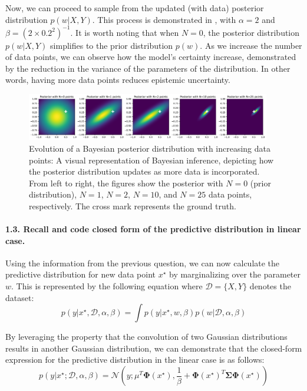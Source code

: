 Now, we can proceed to sample from the updated (with data) posterior distribution $p(w | X, Y)$. This process is demonstrated in , with $\alpha = 2$ and $\beta = (2 \times 0.2^2)^{-1}$. It is worth noting that when $N=0$, the posterior distribution $p(w|X,Y)$ simplifies to the prior distribution $p(w)$. As we increase the number of data points, we can observe how the model's certainty increase, demonstrated by the reduction in the variance of the parameters of the distribution. In other words, having more data points reduces epistemic uncertainty.

\begin{figure}[H]
    \centering
    \includegraphics[width=0.95\textwidth]{posterior.pdf}
    \caption{Evolution of a Bayesian posterior distribution with increasing data points: A visual representation of Bayesian inference, depicting how the posterior distribution updates as more data is incorporated. From left to right, the figures show the posterior with $N=0$ (prior distribution), $N=1$, $N=2$, $N=10$, and $N=25$ data points, respectively. The cross mark represents the ground truth.}
    \label{fig:posterior}
\end{figure}

\paragraph*{1.3. Recall and code closed form of the predictive distribution in linear case.}
Using the information from the previous question, we can now calculate the predictive distribution for new data point $x^\star$ by marginalizing over the parameter $w$. This is represented by the following equation where $\mathcal{D} = \{X,Y\}$ denotes the dataset:
\[ p(y|x^\star , \mathcal{D}, \alpha, \beta ) = \int p(y| x^\star, w, \beta)p(w| \mathcal{D}, \alpha, \beta ) \]

By leveraging the property that the convolution of two Gaussian distributions results in another Gaussian distribution, we can demonstrate that the closed-form expression for the predictive distribution in the linear case is as follows:
\[ p\left(y|x^\star; \mathcal{D}, \alpha, \beta\right) = \mathcal{N}\left(y; \mu^T \boldsymbol{\Phi}(x^\star), \frac{1}{\beta} + \boldsymbol{\Phi}(x^\star)^T \boldsymbol{\Sigma} \boldsymbol{\Phi}(x^\star)\right) \]

